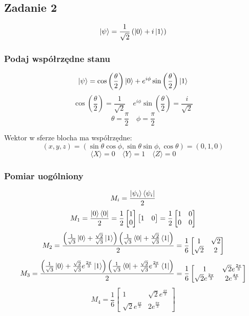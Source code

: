 \documentclass{../notatki}
\begin{document}
\subsection{Zadanie 2}

$$
\ket{\psi} = \frac{1}{\sqrt{2}} \left(\ket{0} + i\ket{1}\right)
$$

\subsubsection{Podaj współrzędne stanu}

$$
\ket{\psi} = \cos\left(\frac{\theta}{2}\right)\ket{0} +
e^{i\phi}\sin\left(\frac{\theta}{2}\right)\ket{1}
$$
$$
\cos\left(\frac{\theta}{2}\right) = \frac{1}{\sqrt{2}} \quad
e^{i\phi} \sin\left(\frac{\theta}{2}\right) = \frac{i}{\sqrt{2}}
$$
$$
\theta = \frac{\pi}{2} \quad \phi = \frac{\pi}{2}
$$

Wektor w sferze blocha ma współrzędne:
$$
(x, y, z) = (\sin\theta\cos\phi, \sin\theta\sin\phi, \cos\theta) = (0, 1, 0)
$$
$$
\langle X \rangle = 0 \quad \langle Y \rangle = 1 \quad \langle Z \rangle = 0
$$

\subsubsection{Pomiar uogólniony}

$$
M_i = \frac{\ket{\psi_i}\bra{\psi_i}}{2}
$$
$$
M_1 = \frac{\ket{0}\bra{0}}{2} = \frac{1}{2}
\begin{bmatrix}
  1 \\ 0
\end{bmatrix}
\begin{bmatrix}
  1 & 0
\end{bmatrix} =
\frac{1}{2}
\begin{bmatrix}
  1 & 0
  \\ 0 & 0
\end{bmatrix}
$$
$$
M_2 = \frac{
  \left(\frac{1}{\sqrt{3}} \ket{0} + \frac{\sqrt{2}}{\sqrt{3}} \ket{1}\right)
  \left(\frac{1}{\sqrt{3}} \bra{0} + \frac{\sqrt{2}}{\sqrt{3}} \bra{1}\right)
}{2} = \frac{1}{6}
\begin{bmatrix}
  1 & \sqrt{2} \\
  \sqrt{2} & 2
\end{bmatrix}
$$
$$
M_3 = \frac{
  \left(\frac{1}{\sqrt{3}} \ket{0} + \frac{\sqrt{2}}{\sqrt{3}}
  e^{\frac{2\pi}{3}} \ket{1}\right)
  \left(\frac{1}{\sqrt{3}} \bra{0} + \frac{\sqrt{2}}{\sqrt{3}}
  e^{\frac{2\pi}{3}} \bra{1}\right)
}{2} = \frac{1}{6}
\begin{bmatrix}
  1 & \sqrt{2}e^{\frac{2\pi}{3}} \\
  \sqrt{2}e^{\frac{2\pi}{3}} & 2e^{\frac{4\pi}{3}}
\end{bmatrix}
$$
$$
M_4 = \frac{1}{6}
\begin{bmatrix}
  1 & \sqrt{2}e^{\frac{4\pi}{3}} \\
  \sqrt{2}e^{\frac{4\pi}{3}} & 2e^{\frac{8\pi}{3}}
\end{bmatrix}
$$
\end{document}
